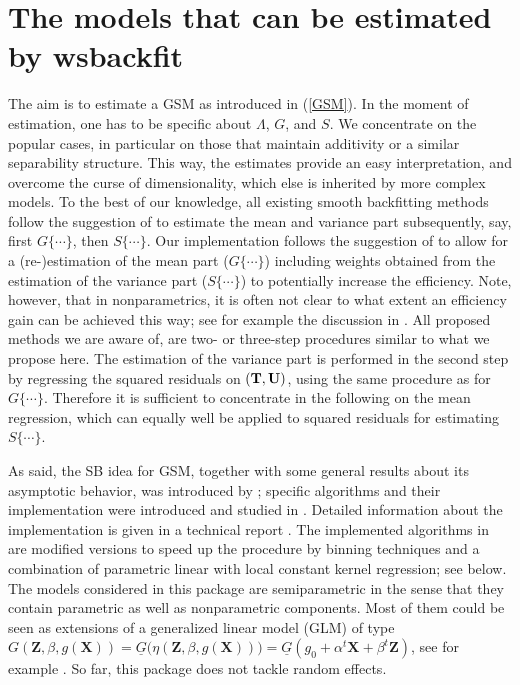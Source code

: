 \section{The models that can be estimated by wsbackfit} \label{sec-models}

The aim is to estimate a GSM as introduced in (\ref{GSM}). In the moment of estimation, one has to be specific about $\Lambda$, $G$, and $S$. We concentrate on the popular cases, in particular on those that maintain additivity or a similar separability structure. This way, the estimates provide an easy interpretation, and overcome the curse of dimensionality, which else is inherited by more complex models. To the best of our knowledge, all existing smooth backfitting methods follow the suggestion of \cite{MN2003} to estimate the mean and variance part subsequently, say, first $G\{ \cdots \}$, then $S\{ \cdots \}$. Our implementation follows the suggestion of \cite{RS2010} to allow for 
a (re-)estimation of the mean part ($G\{ \cdots \}$) including weights obtained from the estimation of the variance part ($S\{ \cdots \}$) to potentially increase the efficiency. 
Note, however, that in nonparametrics, it is often not clear to what extent an efficiency gain can be achieved this way; see for example the discussion in \cite{XiaoEtal2003}.
All proposed methods we are aware of, are two- or three-step procedures
similar to what we propose here. 
The estimation of the variance part is performed in the second step by regressing the squared residuals on $({\bf T,U})$, using the same procedure as for $G\{ \cdots \}$. Therefore it is sufficient to concentrate in the following on the mean regression, which can equally well be applied to squared residuals for estimating $S\{ \cdots \}$.

As said, the SB idea for GSM, together with some general results about its asymptotic behavior, was introduced by \cite{MN2003}; specific algorithms and their implementation were introduced and studied in \citet{RS2010}. Detailed information about the implementation is given in a technical report \citep{RS2008}. The implemented algorithms in  are modified versions to speed up the procedure by binning techniques and a combination of parametric linear with local constant kernel regression; see below. The models considered in this package are semiparametric in the sense that they contain parametric as well as nonparametric components. Most of them could be seen as extensions of a generalized linear model (GLM) of type $G({\mathbf Z},\beta ,g({\mathbf X})) = \underline{G} \big(\eta ({\mathbf Z},\beta,g({\mathbf X})) \big) = \underline{G} ( g_0 + \alpha^t {\mathbf X}+ \beta^t {\mathbf Z}  )$, see for example \cite{MN1989}. So far, this package does not tackle random effects.

